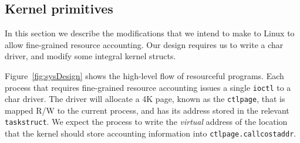 \documentclass[12pt]{article}
\def\_{\textunderscore\-}
\begin{document}
%
%
%

  \subsection{Kernel primitives}\label{kernelprimitives}

  In this section we describe the modifications that we intend to make to Linux to allow fine-grained resource accounting. Our design requires us to write a char driver, and modify some integral kernel structs.

  Figure~\ref{fig:sysDesign} shows the high-level flow of resourceful programs. Each process that requires fine-grained resource accounting issues a single \texttt{ioctl} to a char driver. The driver will allocate a 4K page, known as the \texttt{ctl\_page}, that is mapped R/W to the current process, and has its address stored in the relevant \texttt{task\_struct}. We expect the process to write the \emph{virtual} address of the location that the kernel should store accounting information into \texttt{ctl\_page.call\_cost\_addr}.
\end{document}
